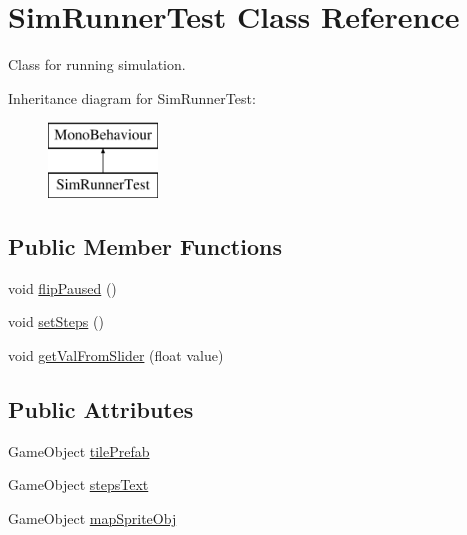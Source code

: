 \hypertarget{class_sim_runner_test}{}\section{Sim\+Runner\+Test Class Reference}
\label{class_sim_runner_test}


Class for running simulation.  


Inheritance diagram for Sim\+Runner\+Test\+:\begin{figure}[H]
\begin{center}
\leavevmode
\includegraphics[height=2.000000cm]{class_sim_runner_test}
\end{center}
\end{figure}
\subsection*{Public Member Functions}
\begin{DoxyCompactItemize}
\item 
void \mbox{\hyperlink{class_sim_runner_test_a2c0a21b60ed966ab67b2bdf46e4b4b4e}{flip\+Paused}} ()
\item 
void \mbox{\hyperlink{class_sim_runner_test_ae48ceacccbc52ef5a7f037f0a723a781}{set\+Steps}} ()
\item 
void \mbox{\hyperlink{class_sim_runner_test_a7919c296008d4ed412b1b6c1469753ef}{get\+Val\+From\+Slider}} (float value)
\end{DoxyCompactItemize}
\subsection*{Public Attributes}
\begin{DoxyCompactItemize}
\item 
Game\+Object \mbox{\hyperlink{class_sim_runner_test_a630ab4bd41cddc58b193d990f8ae225b}{tile\+Prefab}}
\item 
Game\+Object \mbox{\hyperlink{class_sim_runner_test_a6b09f48590c46e807abe6d551b17dda0}{steps\+Text}}
\item 
Game\+Object \mbox{\hyperlink{class_sim_runner_test_aa6c06d9cb1c9bf367315315202abbae7}{map\+Sprite\+Obj}}
\end{DoxyCompactItemize}


